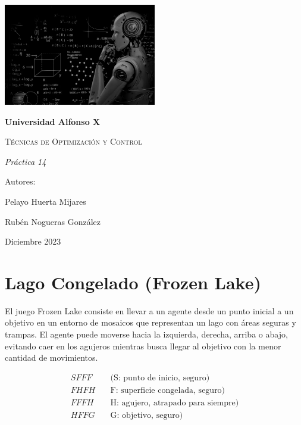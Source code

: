 \documentclass{article}
\begin{document}
    \begin{titlepage}
    \centering
    {\includegraphics[width=0.5\textwidth]{portada.png}\par}
    \vspace{1cm}
    {\bfseries\LARGE Universidad Alfonso X \par}
    \vspace{3cm}
    {\scshape\Huge Técnicas de Optimización y Control \par}
    \vspace{2cm}
    {\itshape\Large Práctica 14 \par}
    \vspace{1cm}
    {\Large Autores: \par}
    {\Large Pelayo Huerta Mijares \par}
    {\Large Rubén Nogueras González \par}
    \vfill
    {\Large Diciembre 2023 \par}
    \end{titlepage}

\section{Lago Congelado (Frozen Lake)}

\vspace{1cm}


El juego Frozen Lake consiste en llevar a un agente desde un punto inicial a un objetivo en un entorno de mosaicos que representan un lago con áreas seguras y trampas. El agente puede moverse hacia la izquierda, derecha, arriba o abajo, evitando caer en los agujeros mientras busca llegar al objetivo con la menor cantidad de movimientos.

\vspace{0.5cm}

\begin{align*}
    S F F F &\: &\text{(S: punto de inicio, seguro)} \\
    F H F H  &\: &\text{F: superficie congelada, seguro)} \\
    F F F H &\: &\text{H: agujero, atrapado para siempre)} \\
    H F F G &\: &\text{G: objetivo, seguro)}
\end{align*}
\end{document}
